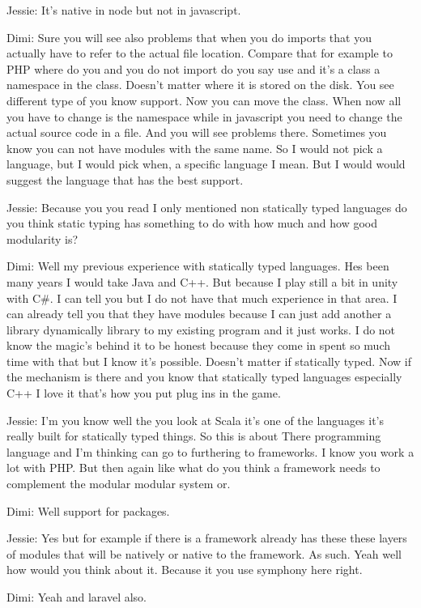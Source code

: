 Jessie: It's native in node but not in javascript.

Dimi: Sure you will see also problems that when you do imports that you actually have to refer to the actual file location. Compare that for example to PHP where do you and you do not import do you say use and it's a class a namespace in the class. Doesn't matter where it is stored on the disk. You see different type of you know support. Now you can move the class. When now all you have to change is the namespace while in javascript you need to change the actual source code in a file. And you will see problems there. Sometimes you know you can not have modules with the same name. So I would not pick a language, but I would pick when, a specific language I mean. But I would would suggest the language that has the best support.

Jessie: Because you you read I only mentioned non statically typed languages do you think static typing has something to do with how much and how good modularity is?

Dimi: Well my previous experience with statically typed languages. Hes been many years I would take Java and C++. But because I play still a bit in unity with C\#. I can tell you but I do not have that much experience in that area. I can already tell you that they have modules because I can just add another a library dynamically library to my existing program and it just works. I do not know the magic's behind it to be honest because they come in spent so much time with that but I know it's possible. Doesn't matter if statically typed. Now if the mechanism is there and you know that statically typed languages especially C++ I love it that's how you put plug ins in the game.

Jessie: I'm you know well the you look at Scala it's one of the languages it's really built for statically typed things. So this is about There programming language and I'm thinking can go to furthering to frameworks. I know you work a lot with PHP. But then again like what do you think a framework needs to complement the modular modular system or.

Dimi: Well support for packages.

Jessie: Yes but for example if there is a framework already has these these layers of modules that will be natively or native to the framework. As such. Yeah well how would you think about it. Because it you use symphony here right.

Dimi: Yeah and laravel also.

